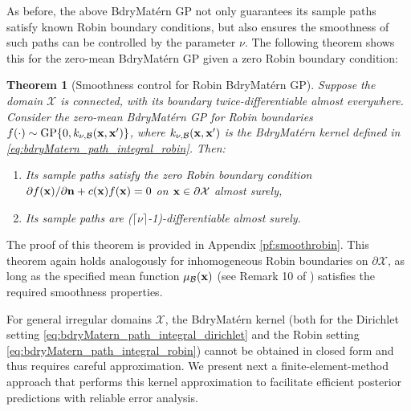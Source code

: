 \documentclass[aos,preprint]{imsart}
\theoremstyle{plain}
\newtheorem{theorem}{Theorem}[section]
\newcommand{\CalX}{\mathcal X}
\newcommand{\Bx}{\bold x}
\newcommand{\BFx}{\bold x}
\theoremstyle{remark}
\begin{document}
As before, the above BdryMat\'ern GP not only guarantees its sample paths satisfy known Robin boundary conditions, but also ensures the smoothness of such paths can be controlled by the parameter $\nu$. The following theorem shows this for the zero-mean BdryMat\'ern GP given a zero Robin boundary condition:
\begin{theorem}[Smoothness control for Robin BdryMat\'ern GP]
Suppose the domain $\CalX$ is connected, with its boundary twice-differentiable almost everywhere. Consider the zero-mean BdryMat\'ern GP for Robin boundaries $f(\cdot) \sim \textup{GP}\{0,k_{\nu,\mathcal{B}}(\BFx, \BFx')\}$, where $k_{\nu,\mathcal{B}}(\BFx, \BFx')$ is the BdryMat\'ern kernel defined in \eqref{eq:bdryMatern_path_integral_robin}. Then:
\begin{enumerate}[label=(\alph*)]
    \item Its sample paths satisfy the zero Robin boundary condition $\partial f(\Bx)/\partial \bold{n} + c(\Bx) f(\Bx) = 0$ on $\Bx \in \partial \mathcal{X}$ almost surely,
    \item Its sample paths are \textup{($\lceil\nu\rceil$-1)}-differentiable almost surely.
\end{enumerate}
\label{thm:smooth}
\end{theorem}
\noindent The proof of this theorem is provided in Appendix \ref{pf:smoothrobin}. This theorem again holds analogously for inhomogeneous Robin boundaries on $\partial \mathcal{X}$, as long as the specified mean function $\mu_{\mathcal{B}}(\Bx)$ (see Remark 10 of \cite{dalton2024boundary}) satisfies the required smoothness properties.

For general irregular domains $\mathcal{X}$, the BdryMat\'ern kernel (both for the Dirichlet setting \eqref{eq:bdryMatern_path_integral_dirichlet} and the Robin setting \eqref{eq:bdryMatern_path_integral_robin}) cannot be obtained in closed form and thus requires careful approximation. We present next a finite-element-method approach that performs this kernel approximation to facilitate efficient posterior predictions with reliable error analysis.

\end{document}
